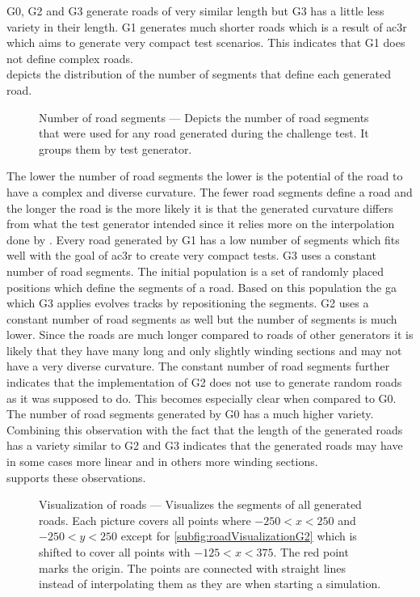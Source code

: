 G0, G2 and G3 generate roads of very similar length but G3 has a little less variety in their length.
G1 generates much shorter roads which is a result of \gls{ac3r} which aims to generate very compact test scenarios.
This indicates that G1 does not define complex roads.\\
 depicts the distribution of the number of segments that define each generated road.
\begin{figure}
    
    \medskip
    \caption{%
        Number of road segments --- Depicts the number of road segments that were used for any road generated during the challenge test.
        It groups them by test generator.
    }\label{fig:numRoadSegments}
\end{figure}
The lower the number of road segments the lower is the potential of the road to have a complex and diverse curvature.
The fewer road segments define a road and the longer the road is the more likely it is that the generated curvature differs from what the test generator intended since it relies more on the interpolation done by \drivebuild{}.
Every road generated by G1 has a low number of segments which fits well with the goal of \gls{ac3r} to create very compact tests.
G3 uses a constant number of road segments.
The initial population is a set of randomly placed positions which define the segments of a road.
Based on this population the \gls{ga} which G3 applies evolves tracks by repositioning the segments.
G2 uses a constant number of road segments as well but the number of segments is much lower.
Since the roads are much longer compared to roads of other generators it is likely that they have many long and only slightly winding sections and may not have a very diverse curvature.
The constant number of road segments further indicates that the implementation of G2 does not use \asfault{} to generate random roads as it was supposed to do.
This becomes especially clear when compared to G0.
The number of road segments generated by G0 has a much higher variety.
Combining this observation with the fact that the length of the generated roads has a variety similar to G2 and G3 indicates that the generated roads may have in some cases more linear and in others more winding sections.\\
 supports these observations.
\begin{figure}
    \centering
    
    \medskip
    \caption{%
        Visualization of roads --- Visualizes the segments of all generated roads.
        Each picture covers all points where \(-250<x<250\) and \(-250<y<250\) except for \cref{subfig:roadVisualizationG2} which is shifted to cover all points with \(-125<x<375\).
        The red point marks the origin.
        The points are connected with straight lines instead of interpolating them as they are when starting a simulation.
    }\label{fig:roadVisualization}
\end{figure}
